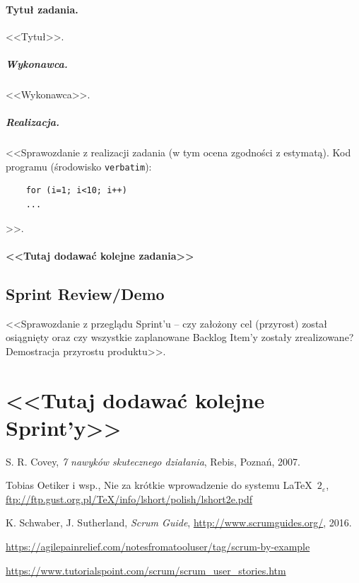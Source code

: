 \documentclass[a4paper]{article}
\begin{document}
	\paragraph{Tytuł zadania.} <<Tytuł>>.
	\subparagraph{Wykonawca.} <<Wykonawca>>.
	\subparagraph{Realizacja.} <<Sprawozdanie z realizacji zadania (w tym ocena zgodności z estymatą). Kod programu (środowisko \texttt{verbatim}): \begin{verbatim}
	for (i=1; i<10; i++)
	...
	\end{verbatim}>>.
	
	\paragraph{<<Tutaj dodawać kolejne zadania>>}
	
	
	\subsection{Sprint Review/Demo}
	<<Sprawozdanie z przeglądu Sprint'u -- czy założony cel (przyrost) został osiągnięty oraz czy wszystkie zaplanowane Backlog Item'y zostały zrealizowane? Demostracja przyrostu produktu>>.
	
	\section*{<<Tutaj dodawać kolejne Sprint'y>>}
	
	
	\begin{thebibliography}{9}
		
		 S. R. Covey, {\em 7 nawyków skutecznego działania}, Rebis, Poznań, 2007.
		
		 Tobias Oetiker i wsp., Nie za krótkie wprowadzenie do systemu \LaTeX  \ $2_\varepsilon$, \url{ftp://ftp.gust.org.pl/TeX/info/lshort/polish/lshort2e.pdf}
		
		 K. Schwaber, J. Sutherland, {\em Scrum Guide}, \url{http://www.scrumguides.org/}, 2016.
		
		 \url{https://agilepainrelief.com/notesfromatooluser/tag/scrum-by-example}
		
		 \url{https://www.tutorialspoint.com/scrum/scrum_user_stories.htm}
		
	\end{thebibliography}
	
\end{document}
